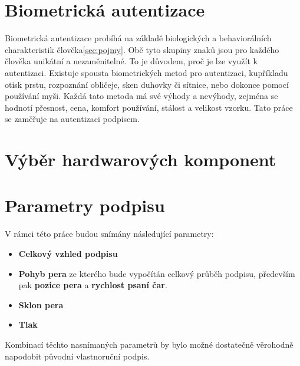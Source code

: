\section{Biometrická autentizace}
Biometrická autentizace probíhá na základě biologických a behaviorálních charakteristik člověka\ref{sec:pojmy}. 
Obě tyto skupiny znaků jsou pro každého člověka unikátní a nezaměnitelné. To je důvodem, proč je lze využít k autentizaci.
Existuje spousta biometrických metod pro autentizaci, kupříkladu otisk prstu, rozpoznání obličeje, sken duhovky či sítnice, nebo dokonce pomocí používání myši. 
Každá tato metoda má své výhody a nevýhody, zejména se hodnotí přesnost, cena, komfort používání, stálost a velikost vzorku.
Tato práce se zaměřuje na autentizaci podpisem.

\section{Výběr hardwarových komponent}

\section{Parametry podpisu}
V rámci této práce budou snímány následující parametry:
\begin{itemize}
  \item{\textbf{Celkový vzhled podpisu}}
  \item{\textbf{Pohyb pera} ze kterého bude vypočítán celkový průběh podpisu, především pak \textbf{pozice pera} a \textbf{rychlost psaní čar}.} %
  \item{\textbf{Sklon pera}} %
  \item{\textbf{Tlak}} %
\end{itemize}
Kombinací těchto nasnímaných parametrů by bylo možné dostatečně věrohodně napodobit původní vlastnoruční podpis. 

